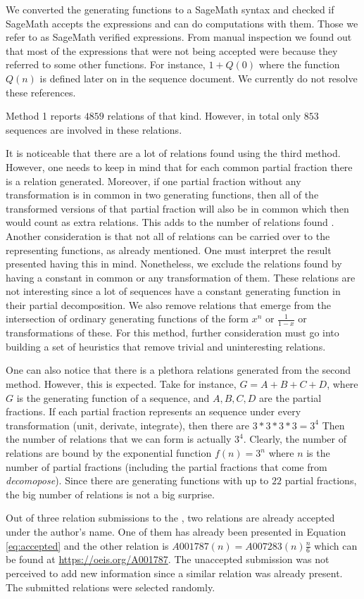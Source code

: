 We converted the generating functions to a SageMath syntax and checked if SageMath accepts the expressions and can do
 computations with them. Those we refer to as SageMath verified expressions. From manual inspection we found out that
  most of the expressions that were not being accepted were because they referred to some other functions. For
  instance, $1+Q(0)$ where the function $Q(n)$ is defined later on in the sequence document. We currently do not
  resolve these references.

Method 1 reports $4859$ relations of that kind. However, in total only $853$ sequences are involved in these relations.

It is noticeable that there are a lot of relations found using the third method. However, one needs to keep in mind
that for each common partial fraction there is a relation generated. Moreover, if one partial fraction without any
transformation is in common in two generating functions, then all of the transformed versions of that partial
fraction will also be in common which then would count as extra relations. This adds to the number of relations found
. Another consideration is that not all of relations can be carried over to the representing functions, as already
mentioned. One must interpret the result presented having this in mind. Nonetheless, we exclude the relations found
by having a constant in common or any transformation of them. These relations are not interesting since a lot of
sequences have a constant generating function in their partial decomposition. We also remove relations that emerge
from the intersection of ordinary generating functions of the form $x^n$ or $\frac{1}{1-x}$ or transformations of
these. For this method, further consideration must go into building a set of heuristics that remove trivial and
uninteresting relations.

One can also notice that there is a plethora relations generated from the second method. However, this is expected.
Take for instance, $G = A + B + C + D$, where $G$ is the generating function of a sequence, and $A,B,C, D$ are the
partial fractions. If each partial fraction represents an \oeis sequence under every transformation (unit, derivate,
integrate), then there are $3*3*3*3=3^4$ Then the number of relations that we can form is actually $3^4$. Clearly,
the number of relations are bound by the exponential function $f(n) = 3^n$ where $n$ is the number of partial
fractions (including the partial fractions that come from \emph{decomopose}). Since there are generating functions
with up to $22$ partial fractions, the big number of relations is not a big surprise.

Out of three relation submissions to the \oeis, two relations are already accepted
\cite{oeis-accepted-1,oeis-accepted-2} under the author's name. One of them has already
been presented in Equation \ref{eq:accepted} and the other relation is
$A001787(n) = A007283(n) \frac{n}{6}$ which can be found at
\url{https://oeis.org/A001787}. The unaccepted submission was not perceived to add new
information since a similar relation was already present. The submitted relations were
selected randomly.

